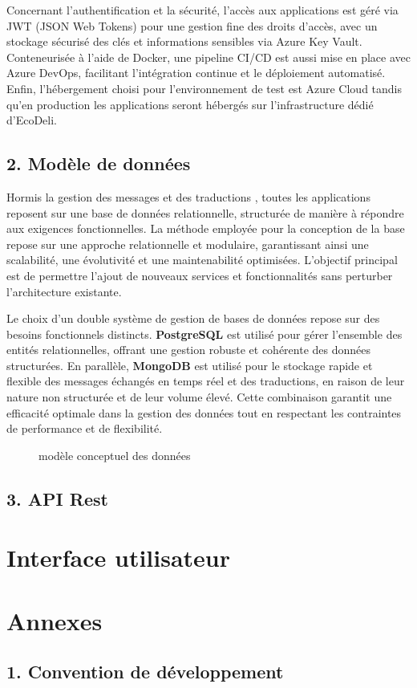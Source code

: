\documentclass{report}
\begin{document}
\noindent Concernant l'authentification et la sécurité, l'accès aux applications est géré via JWT (JSON Web Tokens) pour une gestion fine des droits d'accès, avec un stockage sécurisé des clés et informations sensibles via Azure Key Vault. Conteneurisée à l'aide de Docker, une pipeline CI/CD est aussi mise en place avec Azure DevOps, facilitant l'intégration continue et le déploiement automatisé. Enfin, l'hébergement choisi pour l'environnement de test est Azure Cloud tandis qu'en production les applications seront hébergés sur l'infrastructure dédié d'EcoDeli.

\subsection*{2. Modèle de données}
\vspace{0.2cm}
\noindent Hormis la gestion des messages et des traductions , toutes les applications reposent sur une base de données relationnelle, structurée de manière à répondre aux exigences fonctionnelles. La méthode employée pour la conception de la base repose sur une approche relationnelle et modulaire, garantissant ainsi une scalabilité, une évolutivité et une maintenabilité optimisées. L’objectif principal est de permettre l’ajout de nouveaux services et fonctionnalités sans perturber l’architecture existante.

\noindent Le choix d’un double système de gestion de bases de données repose sur des besoins fonctionnels distincts. \textbf{PostgreSQL} est utilisé pour gérer l’ensemble des entités relationnelles, offrant une gestion robuste et cohérente des données structurées. En parallèle, \textbf{MongoDB} est utilisé pour le stockage rapide et flexible des messages échangés en temps réel et des traductions, en raison de leur nature non structurée et de leur volume élevé. Cette combinaison garantit une efficacité optimale dans la gestion des données tout en respectant les contraintes de performance et de flexibilité.

\begin{figure}[H]
    \centering
    
    \caption{modèle conceptuel des données}
\end{figure}



\subsection*{3. API Rest} %
\vspace{0.2cm}

\section*{\centering Interface utilisateur}
\vspace{0.2cm}

\section*{\centering Annexes}
\vspace{0.2cm}
\subsection*{1. Convention de développement}
\vspace{0.2cm}
\end{document}

